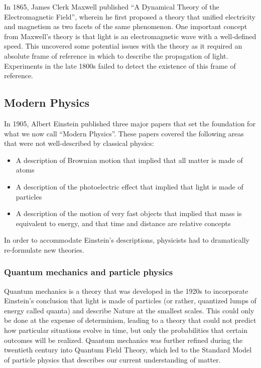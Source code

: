 In 1865, James Clerk Maxwell published ``A Dynamical Theory of the Electromagnetic Field'', wherein he first proposed a theory that unified electricity and magnetism as two facets of the same phenomenon. One important concept from Maxwell's theory is that light is an electromagnetic wave with a well-defined speed. This uncovered some potential issues with the theory as it required an absolute frame of reference in which to describe the propagation of light. Experiments in the late 1800s failed to detect the existence of this frame of reference.

\subsection{Modern Physics}
In 1905, Albert Einstein published three major papers that set the foundation for what we now call ``Modern Physics''. These papers covered the following areas that were not well-described by classical physics:
\begin{itemize}
\item A description of Brownian motion that implied that all matter is made of atoms
\item A description of the photoelectric effect that implied that light is made of particles
\item A description of the motion of very fast objects that implied that mass is equivalent to energy, and that time and distance are relative concepts
\end{itemize}
In order to accommodate Einstein's descriptions, physicists had to dramatically re-formulate new theories. 

\subsubsection{Quantum mechanics and particle physics}
Quantum mechanics is a theory that was developed in the 1920s to incorporate Einstein's conclusion that light is made of particles (or rather, quantized lumps of energy called quanta) and describe Nature at the smallest scales. This could only be done at the expense of determinism, leading to a theory that could not predict how particular situations evolve in time, but only the probabilities that certain outcomes will be realized. Quantum mechanics was further refined during the twentieth century into Quantum Field Theory, which led to the Standard Model of particle physics that describes our current understanding of matter. 

